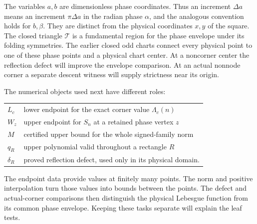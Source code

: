 The variables $a,b$ are dimensionless phase coordinates. Thus an
increment $\Delta a$ means an increment $\pi\Delta a$ in the radian
phase $\alpha$, and the analogous convention holds for $b,\beta$.
They are distinct from the physical coordinates $x,y$ of the square.
The closed triangle $\mathcal T$ is a fundamental region for the
phase envelope under its folding symmetries. The earlier closed odd
charts connect every physical point to one of these phase points and
a physical chart center. At a noncorner center the reflection defect
will improve the envelope comparison. At an actual nonnode corner a
separate descent witness will supply strictness near its origin.

The numerical objects used next have different roles:
\begin{center}\small
\begin{tabular}{@{}ll@{}}
$L_c$ & lower endpoint for the exact corner value $\Lambda_c(n)$\\
$W_z$ & upper endpoint for $S_n$ at a retained phase vertex $z$\\
$M$ & certified upper bound for the whole signed-family norm\\
$q_R$ & upper polynomial valid throughout a rectangle $R$\\
$\delta_R$ & proved reflection defect, used only in its physical domain.
\end{tabular}
\end{center}
The endpoint data provide values at finitely many points. The norm and
positive interpolation turn those values into bounds between the points.
The defect and actual-corner comparisons then distinguish the physical
Lebesgue function from its common phase envelope. Keeping these tasks
separate will explain the leaf tests.

